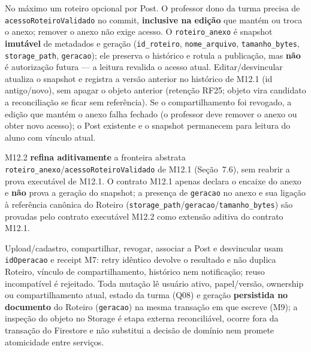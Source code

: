 \begin{regra}
No máximo um roteiro opcional por Post. O professor dono da turma precisa de
\texttt{acessoRoteiroValidado} no commit, \textbf{inclusive na edição} que
mantém ou troca o anexo; remover o anexo não exige acesso. O
\texttt{roteiro\_anexo} é snapshot \textbf{imutável} de metadados e geração
(\texttt{id\_roteiro}, \texttt{nome\_arquivo}, \texttt{tamanho\_bytes},
\texttt{storage\_path}, \texttt{geracao}); ele preserva o histórico e rotula a
publicação, mas \textbf{não} é autorização futura — a leitura revalida o acesso
atual. Editar/desvincular atualiza o snapshot e registra a versão anterior no
histórico de M12.1 (id antigo/novo), sem apagar o objeto anterior (retenção
RF25; objeto vira candidato a reconciliação se ficar sem referência). Se o
compartilhamento foi revogado, a edição que mantém o anexo falha fechado (o
professor deve remover o anexo ou obter novo acesso); o Post existente e o
snapshot permanecem para leitura do aluno com vínculo atual.

M12.2 \textbf{refina aditivamente} a fronteira abstrata
\texttt{roteiro\_anexo}/\texttt{acessoRoteiroValidado} de M12.1 (Seção~7.6), sem
reabrir a prova executável de M12.1. O contrato M12.1 apenas declara o encaixe do
anexo e \textbf{não} prova a geração do snapshot; a presença de \texttt{geracao}
no anexo e sua ligação à referência canônica do Roteiro
(\texttt{storage\_path}/\texttt{geracao}/\texttt{tamanho\_bytes}) são provadas
pelo contrato executável M12.2 como extensão aditiva do contrato M12.1.
\end{regra}

\begin{regra}[Composição M7/M9]
Upload/cadastro, compartilhar, revogar, associar a Post e desvincular usam
\texttt{idOperacao} e receipt M7: retry idêntico devolve o resultado e não
duplica Roteiro, vínculo de compartilhamento, histórico nem notificação; reuso
incompatível é rejeitado. Toda mutação lê usuário ativo, papel/versão, ownership
ou compartilhamento atual, estado da turma (Q08) e geração \textbf{persistida no
documento} do Roteiro (\texttt{geracao}) na mesma transação em que escreve (M9);
a inspeção do objeto no Storage é etapa externa reconciliável, ocorre fora da
transação do Firestore e não substitui a decisão de domínio nem promete
atomicidade entre serviços.
\end{regra}

